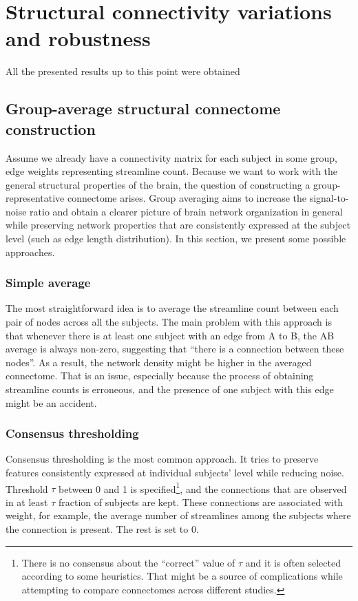 \chapter{Structural connectivity variations and robustness}\label{ch:SC_indepth}


All the presented results up to this point were obtained 

\section{Group-average structural connectome construction}\label{sec:group-avg}

Assume we already have a connectivity matrix for each subject in some group, edge weights representing streamline count. Because we want to work with the general structural properties of the brain, the question of constructing a group-representative connectome arises. Group averaging aims to increase the signal-to-noise ratio and obtain a clearer picture of brain network organization in general while preserving network properties that are consistently expressed at the subject level (such as edge length distribution). \cite{betzel_distance-dependent_2019} In this section, we present some possible approaches.

\subsection{Simple average}\label{sec:average}

The most straightforward idea is to average the streamline count between each pair of nodes across all the subjects. The main problem with this approach is that whenever there is at least one subject with an edge from A to B, the AB average is always non-zero, suggesting that \enquote{there is a connection between these nodes}. As a result, the network density might be higher in the averaged connectome. That is an issue, especially because the process of obtaining streamline counts is erroneous, and the presence of one subject with this edge might be an accident.

\subsection{Consensus thresholding}\label{sec:cons-thr}

Consensus thresholding is the most common approach. It tries to preserve features consistently expressed at individual subjects' level while reducing noise. Threshold $\tau$ between 0 and 1 is specified\footnote{There is no consensus about the \enquote{correct} value of $\tau$ and it is often selected according to some heuristics. That might be a source of complications while attempting to compare connectomes across different studies.}, and the connections that are observed in at least $\tau$ fraction of subjects are kept. These connections are associated with weight, for example, the average number of streamlines among the subjects where the connection is present. The rest is set to 0. \cite{betzel_distance-dependent_2019}

